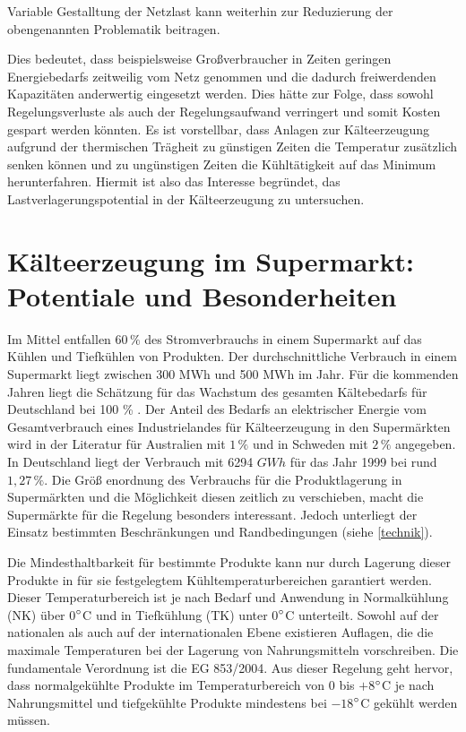 Variable Gestalltung der Netzlast kann weiterhin zur Reduzierung der
obengenannten Problematik beitragen.

Dies bedeutet, dass beispielsweise Gro\ss verbraucher in Zeiten geringen
Energiebedarfs zeitweilig vom Netz genommen und die dadurch freiwerdenden
Kapazit\"aten anderwertig eingesetzt werden. Dies h\"atte zur Folge, dass sowohl
Regelungsverluste als auch der Regelungsaufwand verringert und somit Kosten
gespart werden k\"onnten. Es ist vorstellbar, dass Anlagen zur K\"alteerzeugung
aufgrund der thermischen Tr\"agheit zu g\"unstigen Zeiten die Temperatur
zus\"atzlich senken k\"onnen und zu ung\"unstigen Zeiten die K\"uhlt\"atigkeit
auf das Minimum herunterfahren. Hiermit ist also das Interesse begr\"undet, das
Lastverlagerungspotential in der K\"alteerzeugung zu untersuchen.


\section{K\"alteerzeugung im Supermarkt: Potentiale und Besonderheiten}

Im Mittel entfallen $60\,\%$\cite{leghart, EANRW} des Stromverbrauchs in einem
Supermarkt auf das Kühlen und Tiefkühlen von Produkten. Der durchschnittliche
Verbrauch in einem Supermarkt liegt zwischen 300 MWh und 500 MWh im
Jahr\cite{leghart}. F\"ur die kommenden Jahren liegt die Sch\"atzung f\"ur das
Wachstum des gesamten K\"altebedarfs f\"ur Deutschland bei 100 \% \cite{probst}.
Der Anteil des Bedarfs an elektrischer Energie vom Gesamtverbrauch eines
Industrielandes für Kälteerzeugung in den Supermärkten wird in der Literatur
f\"ur  Australien mit $1\, \%$ \cite{australia} und in Schweden mit $2\, \%$
\cite{doctor, EANRW} angegeben. In Deutschland liegt der Verbrauch mit 6294
$GWh$ f\"ur das Jahr 1999 bei rund $1,27\, \%$\cite{steilme}. Die Gr\"o\ss
enordnung des Verbrauchs f\"ur die Produktlagerung in Superm\"arkten und die
M\"oglichkeit diesen zeitlich zu verschieben, macht die Superm\"arkte f\"ur die
Regelung besonders interessant. Jedoch unterliegt der Einsatz bestimmten
Beschr\"ankungen und Randbedingungen (siehe \cref{technik}).

Die Mindesthaltbarkeit f\"ur bestimmte Produkte kann nur durch Lagerung
dieser Produkte in f\"ur sie festgelegtem K\"uhltemperaturbereichen garantiert
werden. Dieser Temperaturbereich ist je nach Bedarf und Anwendung in
Normalk\"uhlung (NK) über 0$^\circ$C und in
Tiefk\"uhlung (TK) unter 0$^\circ$C unterteilt. Sowohl
auf der nationalen als auch auf der internationalen Ebene existieren Auflagen,
die die maximale Temperaturen bei der Lagerung von Nahrungsmitteln vorschreiben.
Die fundamentale Verordnung ist die EG 853/2004. Aus dieser Regelung geht
hervor, dass normalgekühlte Produkte im Temperaturbereich von 0 bis $+8$$^\circ$C
je nach Nahrungsmittel und tiefgekühlte Produkte mindestens bei $-18$$^\circ$C
gekühlt werden müssen.

